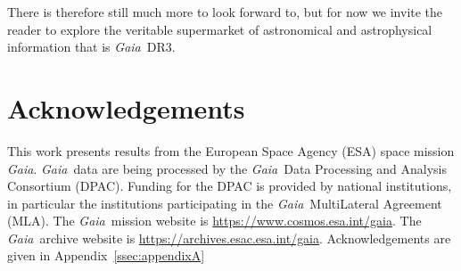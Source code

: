\documentclass[longauth]{aa}
\newcommand\gaia{\textit{Gaia}\xspace}
\providecommand\gdr[1]{\textit{Gaia}~DR#1\xspace}
\begin{document}
There is therefore still much more to look forward to, but for now we invite the reader to explore the veritable supermarket of astronomical and astrophysical information that is \gdr{3}.

%
\section*{Acknowledgements\label{sec:acknowl}}
This work presents results from the European Space Agency (ESA) space mission \gaia. \gaia\ data are being processed by the \gaia\ Data Processing and Analysis Consortium (DPAC). Funding for the DPAC is provided by national institutions, in particular the institutions participating in the \gaia\ MultiLateral Agreement (MLA). The \gaia\ mission website is \url{https://www.cosmos.esa.int/gaia}. The \gaia\ archive website is \url{https://archives.esac.esa.int/gaia}.
Acknowledgements are given in Appendix~\ref{ssec:appendixA}
\end{document}
